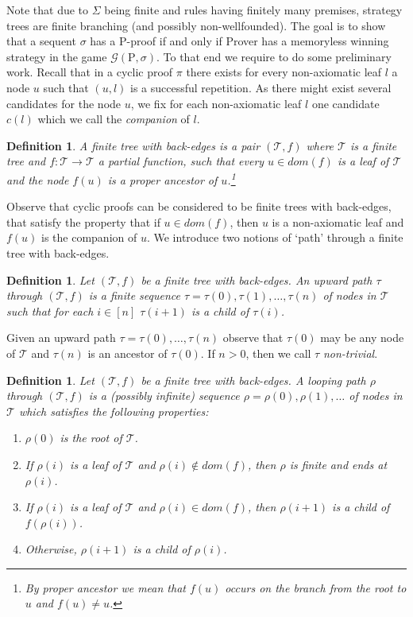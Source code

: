 \documentclass{myifcolog}
\newcommand{\hickp}{\mathrm{P}}
\newtheorem{definition}[theorem]{Definition}
\numberwithin{theorem}{section}
\begin{document}
Note that due to $\Sigma$ being finite and rules having finitely many premises, strategy trees are finite branching (and possibly non-wellfounded). The goal is to show that a sequent $\sigma$ has a $\hickp$-proof if and only if Prover has a memoryless winning strategy in the game $\mathscr{G}(\hickp,\sigma)$. To that end we require to do some preliminary work. Recall that in a cyclic proof $\pi$ there exists for every non-axiomatic leaf $l$ a node $u$ such that $(u, l)$ is a successful repetition. As there might exist several candidates for the node $u$, we fix for each non-axiomatic leaf $l$ one candidate $c(l)$ which we call the \emph{companion} of $l$.
      
      \begin{definition}
          A \emph{finite tree with back-edges} is a pair $(\mathcal{T},f)$ where $\mathcal{T}$ is a finite tree and $f: \mathcal{T} \longrightarrow \mathcal{T}$ a partial function, such that every $u \in dom(f)$ is a leaf of $\mathcal{T}$ and the node $f(u)$ is a proper ancestor of $u$.\footnote{By proper ancestor we mean that $f(u)$ occurs on the branch from the root to $u$ and $f(u) \not = u$.}
      \end{definition}

     Observe that cyclic proofs can be considered to be finite trees with back-edges, that satisfy the property that if $u \in dom(f)$, then $u$ is a non-axiomatic leaf and $f(u)$ is the companion of $u$. We introduce two notions of `path' through a finite tree with back-edges.

     \begin{definition}
         Let $(\mathcal{T}, f)$ be a finite tree with back-edges. An \emph{upward path} $\tau$ through $(\mathcal{T},f)$ is a finite sequence $\tau = \tau(0), \tau(1),\ldots, \tau(n)$ of nodes in $\mathcal{T}$ such that for each $i \in [n]$ $\tau(i+1)$ is a child of $\tau(i)$.
	  \end{definition}

Given an upward path $\tau=\tau(0), \ldots, \tau(n)$ observe that $\tau(0)$ may be any node of $\mathcal{T}$ and $\tau(n)$ is an ancestor of $\tau(0)$. If $n > 0$, then we call $\tau$ \emph{non-trivial}.
	
	  \begin{definition}
	      Let $(\mathcal{T}, f)$ be a finite tree with back-edges. A \emph{looping path} $\rho$ through $(\mathcal{T},f)$ is a (possibly infinite) sequence $\rho = \rho(0), \rho(1),\ldots$ of nodes in $\mathcal{T}$ which satisfies the following properties:
	      \begin{enumerate}
	         \item $\rho(0)$ is the root of $\mathcal{T}$.
	         \item If $\rho(i)$ is a leaf of $\mathcal{T}$ and $\rho(i) \not \in dom(f)$, then $\rho$ is finite and ends at $\rho(i)$.
	          \item If $\rho(i)$ is a leaf of $\mathcal{T}$ and $\rho(i) \in dom(f)$, then $\rho(i+1)$ is a child of $f(\rho(i))$.
	          \item Otherwise, $\rho(i+1)$ is a child of $\rho(i)$.
	      \end{enumerate}
	  \end{definition}
	  
\end{document}
